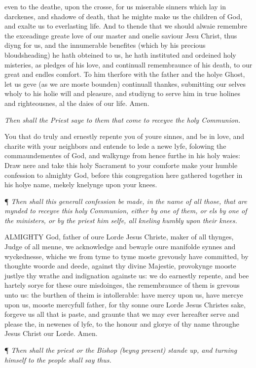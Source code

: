 even to the deathe, upon the crosse, for us miserable sinners which lay
in darckenes, and shadowe of death, that he mighte make us the children
of God, and exalte us to everlasting life. And to thende that we should
alwaie remembre the exceadinge greate love of our master and onelie saviour
Jesu Christ, thus diyng for us, and the innumerable benefites (which by
his precious bloudsheading) he hath obteined to us, he hath instituted
and ordeined holy misteries, as pledges of his love, and continuall remembraunce
of his death, to our great and endles comfort. To him therfore with the
father and the holye Ghost, let us geve (as we are moste bounden) continuall
thankes, submitting our selves wholy to his holie will and pleasure, and
studiyng to serve him in true holines and righteousnes, al the daies of
our life. Amen.

\emph{Then
shall the Priest saye to them that come to receyve the holy Communion.}

You that do truly and ernestly repente you of youre sinnes, and be in
love, and charite with your neighbors and entende to lede a newe lyfe,
folowing the commaundementes of God, and walkynge from hence furthe in
his holy waies: Draw nere and take this holy Sacrament to your comforte
make your humble confession to almighty God, before this congregation
here gathered together in his holye name, mekely knelynge upon your knees.

¶ \emph{Then
shall this generall confession be made, in the name of all those, that
are mynded to receyve this holy Communion, either by one of them, or els
by one of the ministers, or by the priest him selfe, all kneling humbly
upon their knees.}

ALMIGHTY
God, father of oure Lorde Jesus Christe, maker of all thynges, Judge of
all menne, we acknowledge and bewayle oure manifolde synnes and wyckednesse,
whiche we from tyme to tyme moste grevously have committed, by thoughte
woorde and deede, against thy divine Majestie, provokynge mooste justlye
thy wrathe and indignation againste us: we do earnestly repente, and bee
hartely sorye for these oure misdoinges, the remembraunce of them is grevous
unto us: the burthen of theim is intollerable: have mercy upon us, have
mercye upon us, mooste mercyfull father, for thy sonne oure Lorde Jesus
Christes sake, forgeve us all that is paste, and graunte that we may ever
hereafter serve and please the, in newenes of lyfe, to the honour and
glorye of thy name throughe Jesus Christ our Lorde. Amen.

¶
\emph{Then shall the priest or the Bishop (beyng present) stande up, and
turning himself to the people shall say thus.}

